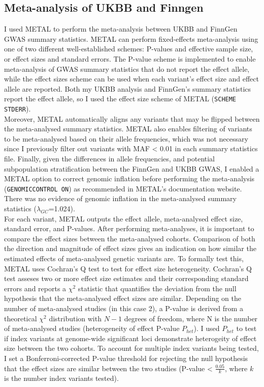\subsection{Meta-analysis of UKBB and Finngen}
I used METAL to perform the meta-analysis between UKBB and FinnGen GWAS summary statistics.  METAL can perform fixed-effects meta-analysis using one of two different well-established schemes: P-values and effective sample size, or effect sizes and standard errors. The P-value scheme is implemented to enable meta-analysis of GWAS summary statistics that do not report the effect allele, while the effect sizes scheme can be used when each variant's effect size and effect allele are reported. Both my UKBB analysis and FinnGen's summary statistics report the effect allele, so I used the effect size scheme of METAL (\Verb+SCHEME STDERR+). \\

Moreover, METAL automatically aligns any variants that may be flipped between the meta-analysed summary statistics. METAL also enables filtering of variants to be meta-analysed based on their allele frequencies, which was not necessary since I previously filter out variants with MAF < 0.01 in each summary statistics file. Finally, given the differences in allele frequencies, and potential subpopulation stratification between the FinnGen and UKBB GWAS, I enabled a METAL option to correct genomic inflation before performing the meta-analysis (\Verb+GENOMICCONTROL ON+) as recommended in METAL's documentation website. There was no evidence of genomic inflation in the meta-analysed summary statistics ($\lambda_{GC}$=1.024).\\

For each variant, METAL outputs the effect allele, meta-analysed effect size, standard error, and P-values. After performing meta-analyses, it is important to compare the effect sizes between the meta-analysed cohorts. Comparison of both the direction and magnitude of effect sizes gives an indication on how similar the estimated effects of meta-analysed genetic variants are. To formally test this, METAL uses Cochran's Q test to test for effect size heterogeneity. Cochran's Q test asseses two or more effect size estimates and their corresponding standard errors and reports a $\chi^{2}$ statistic that quantifies the deviation from the null hypothesis that the meta-analysed effect sizes are similar. Depending on the number of meta-analysed studies (in this case 2), a P-value is derived from a theoretical $\chi^{2}$ distribution with $N-1$ degrees of freedom, where N is the number of meta-analysed studies (heterogeneity of effect P-value $P_{het}$). I used $P_{het}$ to test if index variants at genome-wide significant loci demonstrate heterogeity of effect size between the two cohorts. To account for multiple index variants being tested, I set a Bonferroni-corrected P-value threshold for rejecting the null hypothesis that the effect sizes are similar between the two studies (P-value < $\frac{0.05}{k}$, where $k$ is the number index variants tested).


